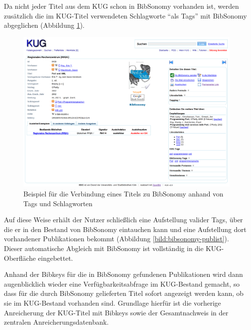 \documentclass[11pt]{scrartcl}
\begin{document}
Da nicht jeder Titel aus dem KUG schon in BibSonomy vorhanden ist,
werden zusätzlich die im KUG-Titel verwendeten Schlagworte "`als
Tags"' mit BibSonomy abgeglichen (Abbildung \ref{bild:bibsonomy}).

\begin{figure}
    \centering \begin{minipage}[b]{1.0\textwidth}
      \centering \includegraphics[width=15cm]{bib20-kug-mashups_bilder/bibsonomytitel.png}
    \end{minipage}
    \caption{Beispiel für die Verbindung eines Titels zu BibSonomy anhand von Tags und Schlagworten}
  \label{bild:bibsonomy}
\end{figure}

Auf diese Weise erhält der Nutzer schließlich eine Aufstellung valider
Tags, über die er in den Bestand von BibSonomy eintauchen kann und
eine Aufstellung dort vorhandener Publikationen bekommt (Abbildung
\ref{bild:bibsonomy-publist}).  Dieser automatische Abgleich mit BibSonomy ist
vollständig in die KUG-Oberfläche eingebettet.

Anhand der Bibkeys für die in BibSonomy gefundenen Publikationen wird
dann augenblicklich wieder eine Verfügbarkeitsabfrage im KUG-Bestand
gemacht, so dass für die durch BibSonomy gelieferten Titel sofort
angezeigt werden kann, ob sie im KUG-Bestand vorhanden sind. Grundlage
hierfür ist die vorherige Anreicherung der KUG-Titel mit Bibkeys sowie
der Gesamtnachweis in der zentralen Anreicherungsdatenbank.
\end{document}
